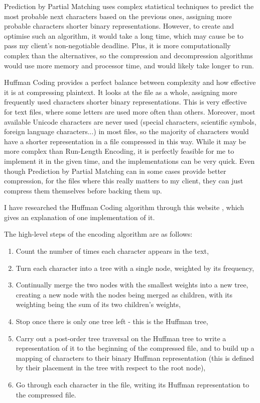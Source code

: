 \documentclass[../main.tex]{subfiles}
\begin{document}
Prediction by Partial Matching uses complex statistical techniques to predict the most probable next characters based on the previous ones, assigning more probable characters shorter binary representations. However, to create and optimise such an algorithm, it would take a long time, which may cause be to pass my client's non-negotiable deadline. Plus, it is more computationally complex than the alternatives, so the compression and decompression algorithms would use more memory and processor time, and would likely take longer to run.

Huffman Coding provides a perfect balance between complexity and how effective it is at compressing plaintext. It looks at the file as a whole, assigning more frequently used characters shorter binary representations. This is very effective for text files, where some letters are used more often than others. Moreover, most available Unicode characters are never used (special characters, scientific symbols, foreign language characters...) in most files, so the majority of characters would have a shorter representation in a file compressed in this way. While it may be more complex than Run-Length Encoding, it is perfectly feasible for me to implement it in the given time, and the implementations can be very quick. Even though Prediction by Partial Matching can in some cases provide better compression, for the files where this really matters to my client, they can just compress them themselves before backing them up.

I have researched the Huffman Coding algorithm through this website \cite{PurdueHuffman}, which gives an explanation of one implementation of it.

The high-level steps of the encoding algorithm are as follows:
\begin{enumerate}
    \item Count the number of times each character appears in the text,
    \item Turn each character into a tree with a single node, weighted by its frequency,
    \item Continually merge the two nodes with the smallest weights into a new tree, creating a new node with the nodes being merged as children, with its weighting being the sum of its two children's weights,
    \item Stop once there is only one tree left - this is the Huffman tree,
    \item Carry out a post-order tree traversal on the Huffman tree to write a representation of it to the beginning of the compressed file, and to build up a mapping of characters to their binary Huffman representation (this is defined by their placement in the tree with respect to the root node),
    \item Go through each character in the file, writing its Huffman representation to the compressed file.
\end{enumerate}
\end{document}
